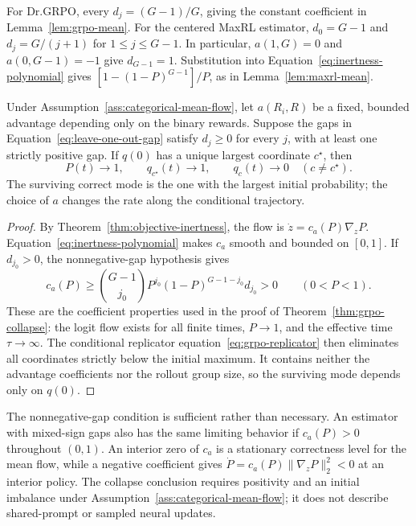 For Dr.GRPO, every $d_j=(G-1)/G$, giving the constant coefficient in
Lemma~\ref{lem:grpo-mean}. For the centered MaxRL estimator,
$d_0=G-1$ and $d_j=G/(j+1)$ for $1\le j\le G-1$.
In particular, $a(1,G)=0$ and $a(0,G-1)=-1$ give $d_{G-1}=1$.
Substitution into Equation~\eqref{eq:inertness-polynomial} gives
$[1-(1-P)^{G-1}]/P$, as in Lemma~\ref{lem:maxrl-mean}.

\begin{corollary}
\enforcehalffinalproseline
\label{cor:class-collapse}
Under Assumption~\ref{ass:categorical-mean-flow}, let $a(R_i,R)$ be a fixed,
bounded advantage depending only on the binary rewards. Suppose the gaps
in Equation~\eqref{eq:leave-one-out-gap} satisfy $d_j\ge0$ for every $j$,
with at least one strictly positive gap. If $q(0)$ has a unique largest
coordinate $c^\star$, then
\[
 P(t)\longrightarrow1,\qquad
 q_{c^\star}(t)\longrightarrow1,\qquad
 q_c(t)\longrightarrow0\quad(c\ne c^\star).
\]
The surviving correct mode is the one with the largest initial probability;
the choice of $a$ changes the rate along the conditional trajectory.
\end{corollary}

\begin{proof}
\enforcehalffinalproseline
By Theorem~\ref{thm:objective-inertness}, the flow is
$\dot z=c_a(P)\nabla_zP$. Equation~\eqref{eq:inertness-polynomial} makes
$c_a$ smooth and bounded on $[0,1]$. If $d_{j_0}>0$, the nonnegative-gap
hypothesis gives
\[
 c_a(P)\ge\binom{G-1}{j_0}P^{j_0}(1-P)^{G-1-j_0}d_{j_0}>0
 \qquad(0<P<1).
\]
These are the coefficient properties used in the proof of
Theorem~\ref{thm:grpo-collapse}: the logit flow exists for all finite times,
$P\to1$, and the effective time $\tau\to\infty$. The conditional
replicator equation~\eqref{eq:grpo-replicator} then eliminates all coordinates
strictly below the initial maximum. It contains neither the advantage
coefficients nor the rollout group size, so the surviving mode depends only
on $q(0)$.
\end{proof}

The nonnegative-gap condition is sufficient rather than necessary. An
estimator with mixed-sign gaps also has the same limiting behavior if
$c_a(P)>0$ throughout $(0,1)$. An interior zero of $c_a$ is a stationary
correctness level for the mean flow, while a negative coefficient gives
$\dot P=c_a(P)\lVert\nabla_zP\rVert_2^2<0$ at an interior policy.
The collapse conclusion requires positivity and an initial imbalance under
Assumption~\ref{ass:categorical-mean-flow}; it does not describe shared-prompt
or sampled neural updates.

